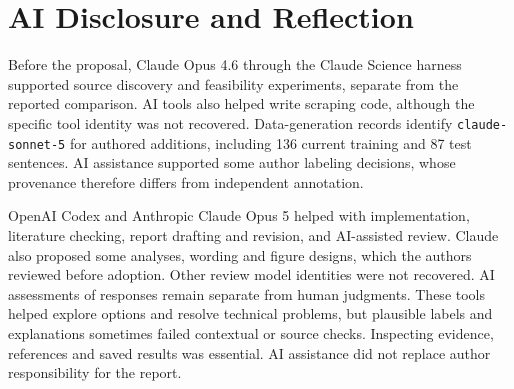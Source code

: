 \section{AI Disclosure and Reflection}
\label{app:disclosure}
Before the proposal, Claude Opus 4.6 through the Claude Science harness supported source discovery and feasibility experiments, separate from the reported comparison. AI tools also helped write scraping code, although the specific tool identity was not recovered. Data-generation records identify \texttt{claude-sonnet-5} for authored additions, including 136 current training and 87 test sentences. AI assistance supported some author labeling decisions, whose provenance therefore differs from independent annotation.

OpenAI Codex and Anthropic Claude Opus 5 helped with implementation, literature checking, report drafting and revision, and AI-assisted review. Claude also proposed some analyses, wording and figure designs, which the authors reviewed before adoption. Other review model identities were not recovered. AI assessments of responses remain separate from human judgments. These tools helped explore options and resolve technical problems, but plausible labels and explanations sometimes failed contextual or source checks. Inspecting evidence, references and saved results was essential. AI assistance did not replace author responsibility for the report.
